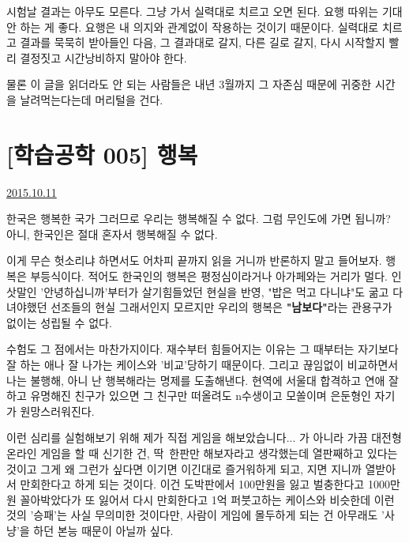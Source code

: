 시험날 결과는 아무도 모른다. 그냥 가서 실력대로 치르고 오면 된다.
요행 따위는 기대 안 하는 게 좋다. 요행은 내 의지와 관계없이 작용하는 것이기 때문이다.
실력대로 치르고 결과를 묵묵히 받아들인 다음, 그 결과대로 갈지, 다른 길로 갈지, 다시 시작할지 빨리 결정짓고 시간낭비하지 말아야 한다.
\vspace{5mm}

물론 이 글을 읽더라도 안 되는 사람들은 내년 3월까지 그 자존심 때문에 귀중한 시간을 날려먹는다는데 머리털을 건다.
\vspace{5mm}






\section{[학습공학 005] 행복}
\href{https://www.kockoc.com/Apoc/406900}{2015.10.11}

\vspace{5mm}

한국은 행복한 국가
그러므로 우리는 행복해질 수 없다.
그럼 무인도에 가면 됩니까?
아니, 한국인은 절대 혼자서 행복해질 수 없다.
\vspace{5mm}

이게 무슨 헛소리냐 하면서도 어차피 끝까지 읽을 거니까 반론하지 말고 들어보자.
행복은 부등식이다. 적어도 한국인의 행복은 평정심이라거나 아가페와는 거리가 멀다.
인삿말인 '안녕하십니까'부터가 살기힘들었던 현실을 반영, "밥은 먹고 다니냐"도 굶고 다녀야했던 선조들의 현실
그래서인지 모르지만 우리의 행복은 \textbf{"남보다"}라는 관용구가 없이는 성립될 수 없다.
\vspace{5mm}

수험도 그 점에서는 마찬가지이다.
재수부터 힘들어지는 이유는 그 때부터는 자기보다 잘 하는 애나 잘 나가는 케이스와 '비교'당하기 때문이다.
그리고 끊임없이 비교하면서 나는 불행해, 아니 난 행복해라는 명제를 도출해낸다.
현역에 서울대 합격하고 연애 잘 하고 유명해진 친구가 있으면 그 친구만 떠올려도 n수생이고 모쏠이며 은둔형인 자기가 원망스러워진다.
\vspace{5mm}

이런 심리를 실험해보기 위해 제가 직접 게임을 해보았습니다... 가 아니라
가끔 대전형 온라인 게임을 할 때 신기한 건, 딱 한판만 해보자라고 생각했는데 열판째하고 있다는 것이고
그게 왜 그런가 싶다면 이기면 이긴대로 즐거워하게 되고, 지면 지니까 열받아서 만회한다고 하게 되는 것이다.
이건 도박판에서 100만원을 잃고 벌충한다고 1000만원 꼴아박았다가 또 잃어서 다시 만회한다고 1억 퍼붓고하는 케이스와 비슷한데
이런 것의 '승패'는 사실 무의미한 것이다만, 사람이 게임에 몰두하게 되는 건 아무래도 '사냥'을 하던 본능 때문이 아닐까 싶다.
\vspace{5mm}

